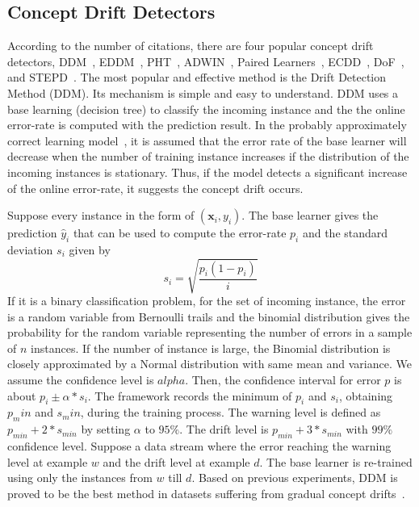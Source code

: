 \subsection{Concept Drift Detectors}
According to the number of citations, there are four popular concept drift detectors, DDM~\cite{gama2004learning}, EDDM~\cite{baena2006ear}, PHT~\cite{page1954continuous}, ADWIN~\cite{bifet2007learning}, Paired Learners~\cite{bach2008paired}, ECDD~\cite{ross2012exponentially}, DoF~\cite{sobhani2011new}, and STEPD~\cite{nishida2007detecting}. The most popular and effective method is the Drift Detection Method (DDM). Its mechanism is simple and easy to understand. DDM uses a base learning (decision tree) to classify the incoming instance and the the online error-rate is computed with the prediction result. In the probably approximately correct learning model~\cite{michalski2013machine}, it is assumed that the error rate of the base learner will decrease when the number of training instance increases if the distribution of the incoming instances is stationary. Thus, if the model detects a significant increase of the online error-rate, it suggests the concept drift occurs. 

Suppose every instance in the form of $(\mathbf{x}_i, y_i)$. The base learner gives the prediction $\hat{y}_i$ that can be used to compute the error-rate $p_i$ and the standard deviation $s_i$ given by 
\begin{equation}
s_i = \sqrt{\frac{p_i(1-p_i)}{i}}
\end{equation}
If it is a binary classification problem, for the set of incoming instance, the error is a random variable from Bernoulli trails and the binomial distribution gives the probability for the random variable representing the number of errors in a sample of $n$ instances. If the number of instance is large, the Binomial distribution is closely approximated by a Normal distribution with same mean and variance. We assume the confidence level is $alpha$. Then, the confidence interval for error $p$ is about $p_i\pm\alpha*s_i$. The framework records the minimum of $p_i$ and $s_i$, obtaining $p_min$ and $s_min$, during the training process. The warning level is defined as $p_{min} + 2 * s_{min}$ by setting $\alpha$ to $95\%$. The drift level is $p_{min} + 3 * s_{min}$ with $99\%$ confidence level. Suppose a data stream where the error reaching the warning level at example $w$ and the drift level at example $d$. The base learner is re-trained using only the instances from $w$ till $d$. Based on previous experiments, DDM is proved to be the best method in datasets suffering from gradual concept drifts~\cite{Goncalves2014}.

